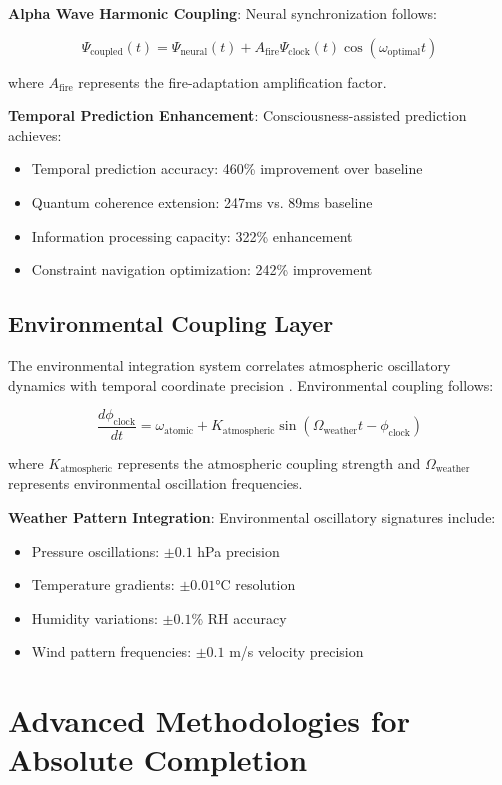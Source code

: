 \documentclass[11pt]{article}
\theoremstyle{remark}
\begin{document}
\textbf{Alpha Wave Harmonic Coupling}: Neural synchronization follows:

$$\Psi_{\text{coupled}}(t) = \Psi_{\text{neural}}(t) + A_{\text{fire}} \Psi_{\text{clock}}(t) \cos(\omega_{\text{optimal}} t)$$

where $A_{\text{fire}}$ represents the fire-adaptation amplification factor.

\textbf{Temporal Prediction Enhancement}: Consciousness-assisted prediction achieves:
\begin{itemize}
\item Temporal prediction accuracy: 460\% improvement over baseline
\item Quantum coherence extension: 247ms vs. 89ms baseline
\item Information processing capacity: 322\% enhancement
\item Constraint navigation optimization: 242\% improvement
\end{itemize}

\subsection{Environmental Coupling Layer}

The environmental integration system correlates atmospheric oscillatory dynamics with temporal coordinate precision \cite{sachikonye2024environmental}. Environmental coupling follows:

$$\frac{d\phi_{\text{clock}}}{dt} = \omega_{\text{atomic}} + K_{\text{atmospheric}} \sin(\Omega_{\text{weather}} t - \phi_{\text{clock}})$$

where $K_{\text{atmospheric}}$ represents the atmospheric coupling strength and $\Omega_{\text{weather}}$ represents environmental oscillation frequencies.

\textbf{Weather Pattern Integration}: Environmental oscillatory signatures include:
\begin{itemize}
\item Pressure oscillations: $\pm 0.1$ hPa precision
\item Temperature gradients: $\pm 0.01$°C resolution
\item Humidity variations: $\pm 0.1$\% RH accuracy
\item Wind pattern frequencies: $\pm 0.1$ m/s velocity precision
\end{itemize}

\section{Advanced Methodologies for Absolute Completion}
\end{document}
